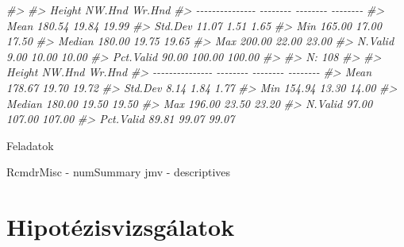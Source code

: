 \documentclass[
]{book}
\newenvironment{Shaded}{\begin{snugshade}}{\end{snugshade}}
\newcommand{\CommentTok}[1]{\textcolor[rgb]{0.56,0.35,0.01}{\textit{#1}}}
\begin{document}
\begin{Shaded}
\begin{Highlighting}[]
\CommentTok{\#\textgreater{} }
\CommentTok{\#\textgreater{}                   Height   NW.Hnd   Wr.Hnd}
\CommentTok{\#\textgreater{} {-}{-}{-}{-}{-}{-}{-}{-}{-}{-}{-}{-}{-}{-}{-} {-}{-}{-}{-}{-}{-}{-}{-} {-}{-}{-}{-}{-}{-}{-}{-} {-}{-}{-}{-}{-}{-}{-}{-}}
\CommentTok{\#\textgreater{}            Mean   180.54    19.84    19.99}
\CommentTok{\#\textgreater{}         Std.Dev    11.07     1.51     1.65}
\CommentTok{\#\textgreater{}             Min   165.00    17.00    17.50}
\CommentTok{\#\textgreater{}          Median   180.00    19.75    19.65}
\CommentTok{\#\textgreater{}             Max   200.00    22.00    23.00}
\CommentTok{\#\textgreater{}         N.Valid     9.00    10.00    10.00}
\CommentTok{\#\textgreater{}       Pct.Valid    90.00   100.00   100.00}
\CommentTok{\#\textgreater{} }
\CommentTok{\#\textgreater{} N: 108  }
\CommentTok{\#\textgreater{} }
\CommentTok{\#\textgreater{}                   Height   NW.Hnd   Wr.Hnd}
\CommentTok{\#\textgreater{} {-}{-}{-}{-}{-}{-}{-}{-}{-}{-}{-}{-}{-}{-}{-} {-}{-}{-}{-}{-}{-}{-}{-} {-}{-}{-}{-}{-}{-}{-}{-} {-}{-}{-}{-}{-}{-}{-}{-}}
\CommentTok{\#\textgreater{}            Mean   178.67    19.70    19.72}
\CommentTok{\#\textgreater{}         Std.Dev     8.14     1.84     1.77}
\CommentTok{\#\textgreater{}             Min   154.94    13.30    14.00}
\CommentTok{\#\textgreater{}          Median   180.00    19.50    19.50}
\CommentTok{\#\textgreater{}             Max   196.00    23.50    23.20}
\CommentTok{\#\textgreater{}         N.Valid    97.00   107.00   107.00}
\CommentTok{\#\textgreater{}       Pct.Valid    89.81    99.07    99.07}
\end{Highlighting}
\end{Shaded}

Feladatok

RcmdrMisc - numSummary
jmv - descriptives

\hypertarget{hipotezisvizsgalatok}{%
\chapter{Hipotézisvizsgálatok}\label{hipotezisvizsgalatok}}
\end{document}
